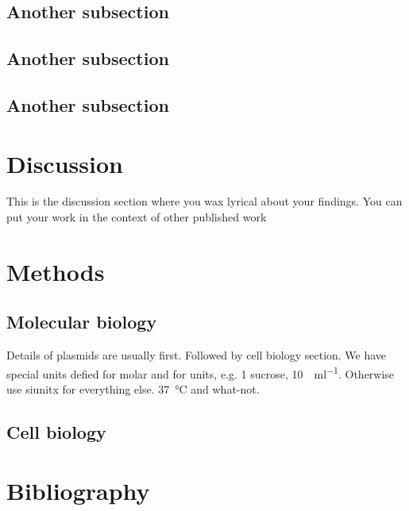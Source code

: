 \lipsum[12]

\subsection*{Another subsection}

\lipsum[13-14]

\subsection*{Another subsection}

\lipsum[13-14]

\subsection*{Another subsection}

\lipsum[13-14]

\section*{Discussion}\label{s:discussion}

This is the discussion section where you wax lyrical about your findings.
You can put your work in the context of other published work \citep{brenner_uga:_1967}

\lipsum[100-104]

\section*{Methods}\label{s:methods}

\subsection*{Molecular biology}

Details of plasmids are usually first.
Followed by cell biology section.
We have special units defied for molar and for units, e.g. \SI{1}{\Molar} sucrose, \SI{10}{\Units\per\milli\litre}.
Otherwise use siunitx for everything else. \SI{37}{\degreeCelsius} and what-not.

\subsection*{Cell biology}

\lipsum[80]

\section*{Bibliography}

